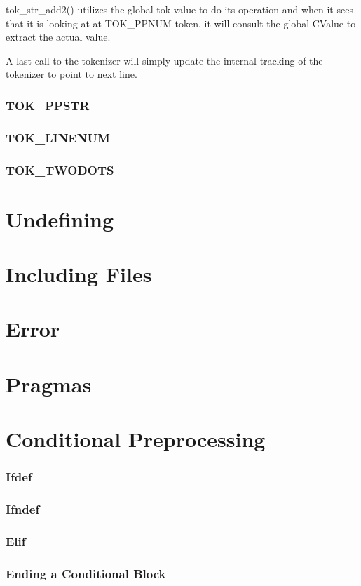 tok\_str\_add2() utilizes the global tok value to do its operation and when it sees that it is looking at at TOK\_PPNUM token, it will consult the global CValue to extract the actual value.

A last call to the tokenizer will simply update the internal tracking of the tokenizer to point to next line.
\subsubsection{TOK\_PPSTR}
\subsubsection{TOK\_LINENUM}
\subsubsection{TOK\_TWODOTS}






\section{Undefining}

\section{Including Files}

\section{Error}

\section{Pragmas}

\section{Conditional Preprocessing}

\subsubsection{Ifdef}
\subsubsection{Ifndef}
\subsubsection{Elif}

\subsubsection{Ending a Conditional Block}


